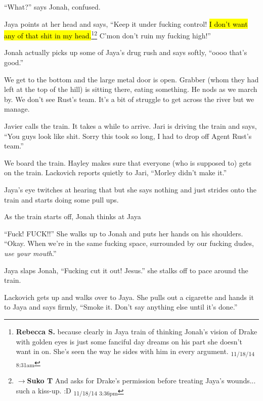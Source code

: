 ``What?'' says Jonah, confused.

Jaya points at her head and says, ``Keep it under fucking control!  \hl{I don't want any of that shit in my head.}\footnote{\textbf{Rebecca S. }because clearly in Jaya train of thinking Jonah's vision of Drake with golden eyes is just some fanciful day dreams on his part she doesn't want in on.  She's seen the way he sides with him in every argument. \textsubscript{11/18/14 8:31am}}\footnote{$\rightarrow$\textbf{Suko T }And asks for Drake's permission before treating Jaya's wounds... such a kiss-up. :D \textsubscript{11/18/14 3:36pm}}  C'mon don't ruin my fucking high!''

Jonah actually picks up some of Jaya's drug rush and says softly, ``oooo that's good.''



We get to the bottom and the large metal door is open.  Grabber (whom they had left at the top of the hill) is sitting there, eating something.  He nods as we march by.  We don't see Rust's team.  It's a bit of struggle to get across the river but we manage.



Javier calls the train.  It takes a while to arrive.  Jari is driving the train and says, ``You guys look like shit.  Sorry this took so long, I had to drop off Agent Rust's team.''

We board the train.   Hayley makes sure that everyone (who is supposed to) gets on the train.  Lackovich reports quietly to Jari, ``Morley didn't make it.''

Jaya's eye twitches at hearing that but she says nothing and just strides onto the train and starts doing some pull ups.



As the train starts off, Jonah thinks at Jaya  

``Fuck!  FUCK!!'' She walks up to Jonah and puts her hands on his shoulders.  ``Okay.  When we're in the same fucking space, surrounded by our fucking dudes, \textit{use your mouth}.''


Jaya slaps Jonah, ``Fucking cut it out!  Jesus.'' she stalks off to pace around the train.




Lackovich gets up and walks over to Jaya.  She pulls out a cigarette and hands it to Jaya and says firmly, ``Smoke it.  Don't say anything else until it's done.''

